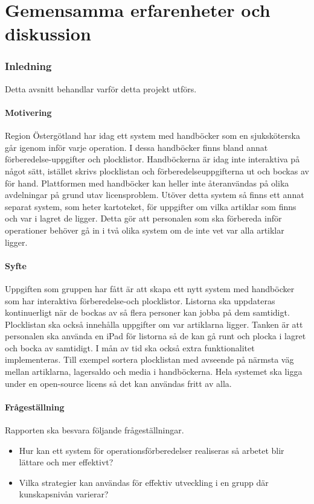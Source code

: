 \documentclass{article}
\begin{document}
\newpage
\tableofcontents
\newpage
{}

\part{Gemensamma erfarenheter och diskussion}

\section{Inledning}
Detta avsnitt behandlar varför detta projekt utförs.
\subsection{Motivering}

Region Östergötland har idag ett system med handböcker som en sjuksköterska går igenom inför varje operation. I dessa handböcker finns bland annat förberedelse-uppgifter och plocklistor. Handböckerna är idag inte interaktiva på något sätt, istället skrivs plocklistan och förberedelse\-uppgifterna ut och bockas av för hand. Plattformen med handböcker kan heller inte återanvändas på olika avdelningar på grund utav licensproblem. Utöver detta system så finns ett annat separat system, som heter kartoteket, för uppgifter om vilka artiklar som finns och var i lagret de ligger. Detta gör att personalen som ska förbereda inför operationer behöver gå in i två olika system om de inte vet var alla artiklar ligger.

\subsection{Syfte}
Uppgiften som gruppen har fått är att skapa ett nytt system med handböcker som har interaktiva förberedelse-och plocklistor. Listorna ska uppdateras kontinuerligt när de bockas av så flera personer kan jobba på dem samtidigt. Plocklistan ska också innehålla uppgifter om var artiklarna ligger. Tanken är att personalen 
ska använda en iPad för listorna så de kan gå runt och plocka i lagret och bocka av samtidigt.
I mån av tid ska också extra funktionalitet implementeras. Till exempel sortera plocklistan med avseende på närmsta väg mellan artiklarna, lagersaldo och media i handböckerna.
Hela systemet ska ligga under en open-source licens så det kan användas fritt av alla.    

\subsection{Frågeställning}
Rapporten ska besvara följande frågeställningar.
\begin{itemize}
\item Hur kan ett system för operationsförberedelser realiseras så arbetet blir lättare och mer effektivt?
\item Vilka strategier kan användas för effektiv utveckling i en grupp där kunskapsnivån varierar? 
\end{itemize}
\end{document}
